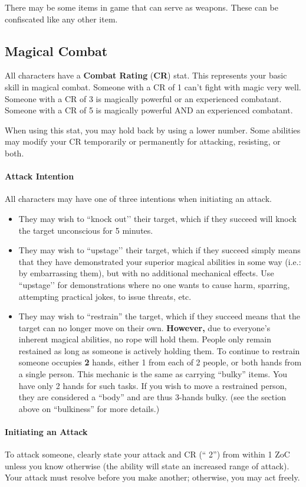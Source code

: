 \documentclass[sheet]{GL2020}
\begin{document}
There may be some items in game that can serve as weapons. These can be confiscated like any other item.

\subsection{Magical Combat}
All characters have a {\bf Combat Rating} ({\bf CR}) stat. This represents your basic skill in magical combat. Someone with a CR of 1 can't fight with magic very well. Someone with a CR of 3 is magically powerful or an experienced combatant. Someone with a CR of 5 is magically powerful AND an experienced combatant. 

When using this stat, you may hold back by using a lower number. Some abilities may modify your CR temporarily or permanently for attacking, resisting, or both.

\paragraph{Attack Intention} All characters may have one of three intentions when initiating an attack. 
\begin{itemize}
	\item They may wish to ``knock out’’ their target, which if they succeed will knock the target unconscious for 5 minutes. 
	\item They may wish to ``upstage’’ their target, which if they succeed simply means that they have demonstrated your superior magical abilities in some way (i.e.: by embarrassing them), but with no additional mechanical effects. Use ``upstage’’ for demonstrations where no one wants to cause harm, sparring, attempting practical jokes, to issue threats, etc. 
	\item They may wish to ``restrain'' the target, which if they succeed means that the target can no longer move on their own. \textbf{However,} due to everyone's inherent magical abilities, no rope will hold them. People only remain restained as long as someone is actively holding them. To continue to restrain someone occupies \textbf{2} hands, either 1 from each of 2 people, or both hands from a single person. This mechanic is the same as carrying ``bulky'' items. You have only 2 hands for such tasks. If you wish to move a restrained person, they are considered a ``body'' and are thus 3-hands bulky. (see the section above on ``bulkiness'' for more details.)
\end{itemize}

\paragraph{Initiating an Attack} To attack someone, clearly state your attack and CR (``\aKnockOut{} 2'') from within 1 ZoC unless you know otherwise (the ability will state an increased range of attack). Your attack must resolve before you make another; otherwise, you may act freely. 
\end{document}
